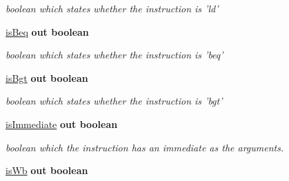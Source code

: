 \begin{DoxyCompactItemize}
\begin{DoxyCompactList}\small\item\em boolean which states whether the instruction is 'ld' \end{DoxyCompactList}\item 
\hypertarget{class_c_unit_aebbb21b47d7fdc5172ad6c088a2c339b}{\hyperlink{class_c_unit_aebbb21b47d7fdc5172ad6c088a2c339b}{is\-Beq}  {\bfseries {\bfseries \textcolor{vhdlkeyword}{out}\textcolor{vhdlchar}{ }}} {\bfseries \textcolor{comment}{boolean}\textcolor{vhdlchar}{ }} }\label{class_c_unit_aebbb21b47d7fdc5172ad6c088a2c339b}

\begin{DoxyCompactList}\small\item\em boolean which states whether the instruction is 'beq' \end{DoxyCompactList}\item 
\hypertarget{class_c_unit_a1df57aa5d86b9d2c21f1ca79aacac3f9}{\hyperlink{class_c_unit_a1df57aa5d86b9d2c21f1ca79aacac3f9}{is\-Bgt}  {\bfseries {\bfseries \textcolor{vhdlkeyword}{out}\textcolor{vhdlchar}{ }}} {\bfseries \textcolor{comment}{boolean}\textcolor{vhdlchar}{ }} }\label{class_c_unit_a1df57aa5d86b9d2c21f1ca79aacac3f9}

\begin{DoxyCompactList}\small\item\em boolean which states whether the instruction is 'bgt' \end{DoxyCompactList}\item 
\hypertarget{class_c_unit_a98e2b65456db66badf1296ad798288be}{\hyperlink{class_c_unit_a98e2b65456db66badf1296ad798288be}{is\-Immediate}  {\bfseries {\bfseries \textcolor{vhdlkeyword}{out}\textcolor{vhdlchar}{ }}} {\bfseries \textcolor{comment}{boolean}\textcolor{vhdlchar}{ }} }\label{class_c_unit_a98e2b65456db66badf1296ad798288be}

\begin{DoxyCompactList}\small\item\em boolean which the instruction has an immediate as the arguments. \end{DoxyCompactList}\item 
\hypertarget{class_c_unit_ab8f0ec8ea90e74b7d464ecad474f9c67}{\hyperlink{class_c_unit_ab8f0ec8ea90e74b7d464ecad474f9c67}{is\-Wb}  {\bfseries {\bfseries \textcolor{vhdlkeyword}{out}\textcolor{vhdlchar}{ }}} {\bfseries \textcolor{comment}{boolean}\textcolor{vhdlchar}{ }} }\label{class_c_unit_ab8f0ec8ea90e74b7d464ecad474f9c67}


\end{DoxyCompactItemize}
